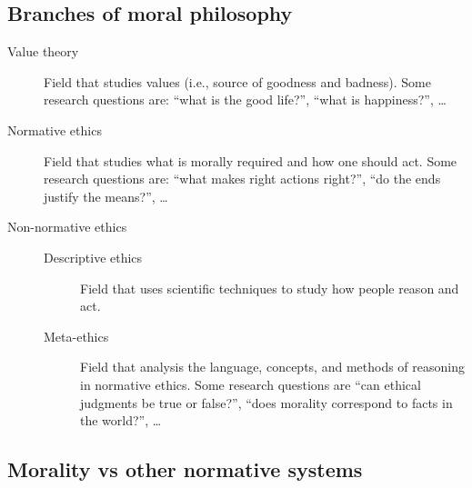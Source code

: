 \subsection{Branches of moral philosophy}

\begin{description}
    \item[Value theory] 
        Field that studies values (i.e., source of goodness and badness). Some research questions are: ``what is the good life?'', ``what is happiness?'', \dots

    \item[Normative ethics] 
        Field that studies what is morally required and how one should act. Some research questions are: ``what makes right actions right?'', ``do the ends justify the means?'', \dots

    \item[Non-normative ethics] \phantom{}
        \begin{description}
            \item[Descriptive ethics] 
                Field that uses scientific techniques to study how people reason and act.

            \item[Meta-ethics] 
                Field that analysis the language, concepts, and methods of reasoning in normative ethics. Some research questions are ``can ethical judgments be true or false?'', ``does morality correspond to facts in the world?'', \dots
        \end{description}
\end{description}


\subsection{Morality vs other normative systems}

